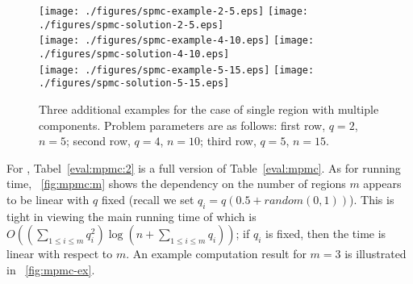\begin{figure}[ht!]
    \centering
    \texttt{[image: ./figures/spmc-example-2-5.eps]}
    \texttt{[image: ./figures/spmc-solution-2-5.eps]}
    \vspace*{2mm} \\
    \texttt{[image: ./figures/spmc-example-4-10.eps]}
    \texttt{[image: ./figures/spmc-solution-4-10.eps]} \\
    \vspace*{2mm}
    \texttt{[image: ./figures/spmc-example-5-15.eps]}
    \hspace{5mm}
    \texttt{[image: ./figures/spmc-solution-5-15.eps]}
    \vspace*{-3mm}
    \caption{\label{fig:opg-more-spmc-ex} Three additional examples for the 
		case of single region with multiple components. Problem parameters 
		are as follows: first row, $q = 2$, $n = 5$; second row, $q = 4$, 
		$n = 10$; third row, $q = 5$, $n = 15$.} 
    \vspace*{-4mm}
\end{figure}


For \algoMRG, Tabel~\ref{eval:mpmc:2} is a full version of 
Table~\ref{eval:mpmc}. As for running time, ~\ref{fig:mpmc:m} shows 
the dependency on the number of regions $m$ appears to be linear with 
$q$ fixed (recall we set $q_i = q(0.5 + random(0,1))$). This is tight
in viewing the main running time of \algoMRG which is 
$O((\sum_{1\le i \le m} q_i^2) \log(n + \sum_{1\le i \le m} q_i))$; if
$q_i$ is fixed, then the time is linear with respect to $m$. An example 
computation result for $m = 3$ is illustrated in ~\ref{fig:mpmc-ex}. 

